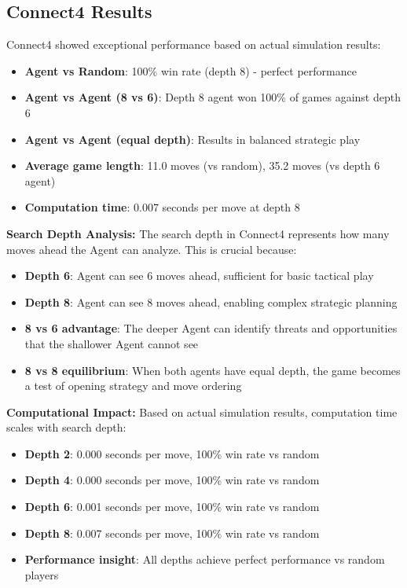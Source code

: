 \documentclass[12pt]{article}
\begin{document}
\subsection{Connect4 Results}

Connect4 showed exceptional performance based on actual simulation results:
\begin{itemize}
    \item \textbf{Agent vs Random}: 100\% win rate (depth 8) - perfect performance
    \item \textbf{Agent vs Agent (8 vs 6)}: Depth 8 agent won 100\% of games against depth 6
    \item \textbf{Agent vs Agent (equal depth)}: Results in balanced strategic play
    \item \textbf{Average game length}: 11.0 moves (vs random), 35.2 moves (vs depth 6 agent)
    \item \textbf{Computation time}: 0.007 seconds per move at depth 8
\end{itemize}

\textbf{Search Depth Analysis:}
The search depth in Connect4 represents how many moves ahead the Agent can analyze. This is crucial because:
\begin{itemize}
    \item \textbf{Depth 6}: Agent can see 6 moves ahead, sufficient for basic tactical play
    \item \textbf{Depth 8}: Agent can see 8 moves ahead, enabling complex strategic planning
    \item \textbf{8 vs 6 advantage}: The deeper Agent can identify threats and opportunities that the shallower Agent cannot see
    \item \textbf{8 vs 8 equilibrium}: When both agents have equal depth, the game becomes a test of opening strategy and move ordering
\end{itemize}

\textbf{Computational Impact:}
Based on actual simulation results, computation time scales with search depth:
\begin{itemize}
    \item \textbf{Depth 2}: 0.000 seconds per move, 100\% win rate vs random
    \item \textbf{Depth 4}: 0.000 seconds per move, 100\% win rate vs random
    \item \textbf{Depth 6}: 0.001 seconds per move, 100\% win rate vs random
    \item \textbf{Depth 8}: 0.007 seconds per move, 100\% win rate vs random
    \item \textbf{Performance insight}: All depths achieve perfect performance vs random players
\end{itemize}
\end{document}

